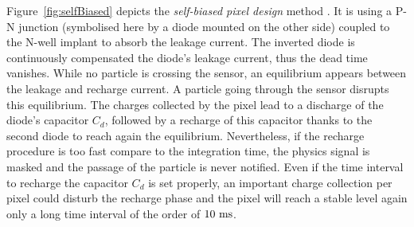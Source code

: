     Figure~\ref{fig:selfBiased} depicts the \textit{self-biased pixel design} method \cite{Deveaux2009}.
    It is using a P-N junction (symbolised here by a diode mounted on the other side) coupled to the N-well implant to absorb the leakage current.
    The inverted diode is continuously compensated the diode's leakage current, thus the dead time vanishes.
    While no particle is crossing the sensor, an equilibrium appears between the leakage and recharge current.
    A particle going through the sensor disrupts this equilibrium.
    The charges collected by the pixel lead to a discharge of the diode's capacitor $C_d$, followed by a recharge of this capacitor thanks to the second diode to reach again the equilibrium.
    Nevertheless, if the recharge procedure is too fast compare to the integration time, the physics signal is masked and the passage of the particle is never notified.
    Even if the time interval to recharge the capacitor $C_d$ is set properly, an important charge collection per pixel could disturb the recharge phase and the pixel will reach a stable level again only a long time interval of the order of $10~\rm{ms}$.

